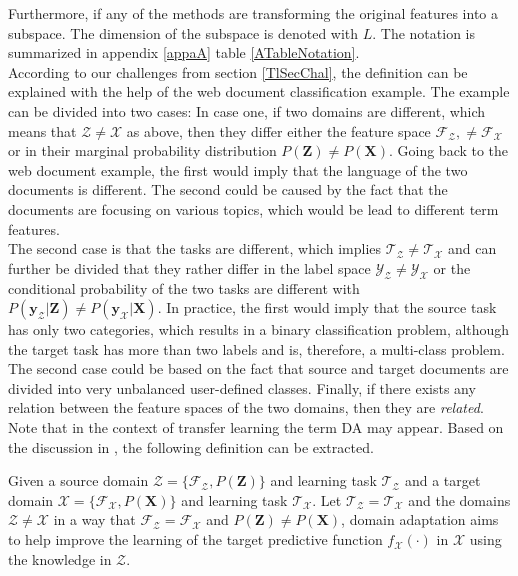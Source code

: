 Furthermore, if any of the methods are transforming the original features into a subspace. The dimension of the subspace is denoted with $L$.
The notation is summarized in appendix \ref{appaA} table \ref{ATableNotation}.\\
According to our challenges from section \ref{TlSecChal}, the definition can be explained with the help of the web document classification example.\cite[p. 4]{Weiss.2016}
The example can be divided into two cases:
In case one, if two domains are different, which means that $\mathcal{Z} \neq \mathcal{X}$ as above, then they differ either the feature space $\mathcal{F_Z}, \neq \mathcal{F_X}$ or in their marginal probability distribution $P(\mathbf{Z}) \neq P(\mathbf{X})$.
Going back to the web document example, the first would imply that the language of the two documents is different.
The second could be caused by the fact that the documents are focusing on various topics, which would be lead to different term features.\cite{Pan.2010}\\
The second case is that the tasks are different, which implies $\mathcal{T_Z} \neq \mathcal{T_X}$ and can further be divided that they rather differ in the label space $\mathcal{Y_Z} \neq \mathcal{Y_X}$ or the conditional probability of the two tasks are different with $P(\mathbf{y}_\mathcal{Z}\vert \mathbf{Z}) \neq P(\mathbf{y}_\mathcal{X}\vert \mathbf{X})$.
In practice, the first would imply that the source task has only two categories, which results in a binary classification problem, although the target task has more than two labels and is, therefore, a multi-class problem.
The second case could be based on the fact that source and target documents are divided into very unbalanced user-defined classes.
Finally, if there exists any relation between the feature spaces of the two domains, then they are \textit{related}.\cite{Pan.2010}\\
Note that in the context of transfer learning the term \ac{DA} may appear.
Based on the discussion in \cite{Pan.2011}, the following definition can be extracted.
\begin{mDef}\label{DefDa}
	Given a source domain $\mathcal{Z}=\{\mathcal{F}_\mathcal{Z},P(\mathbf{Z})\}$ and learning task $\mathcal{T_Z}$ and a target domain $\mathcal{X}=\{\mathcal{F}_\mathcal{X},P(\mathbf{X})\}$ and learning task $\mathcal{T_X}$. Let $\mathcal{T_Z} = \mathcal{T_X}$ and the domains $\mathcal{Z} \neq \mathcal{X}$ in a way that $\mathcal{F}_\mathcal{Z} = \mathcal{F}_\mathcal{X}$ and $P(\mathbf{Z}) \neq P(\mathbf{X})$, domain adaptation aims to help improve the learning of the target predictive function $f_\mathcal{X}(\cdot)$ in $\mathcal{X}$ using the knowledge in $\mathcal{Z}$.
\end{mDef}

